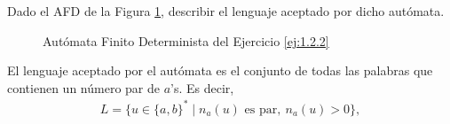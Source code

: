 \begin{ejercicio} \label{ej:1.2.2}
    Dado el AFD de la Figura \ref{fig:ej:1.2.2}, describir el lenguaje aceptado por dicho autómata.
    \begin{figure}
        \centering
        \caption{Autómata Finito Determinista del Ejercicio \ref{ej:1.2.2}}
        \label{fig:ej:1.2.2}
    \end{figure}

    El lenguaje aceptado por el autómata es el conjunto de todas las palabras que contienen
    un número par de $a$'s. Es decir,
    \begin{align*}
        L = \{u \in \{a, b\}^* \mid n_a(u) \text{ es par},~n_a(u)>0\},
    \end{align*}
\end{ejercicio}

